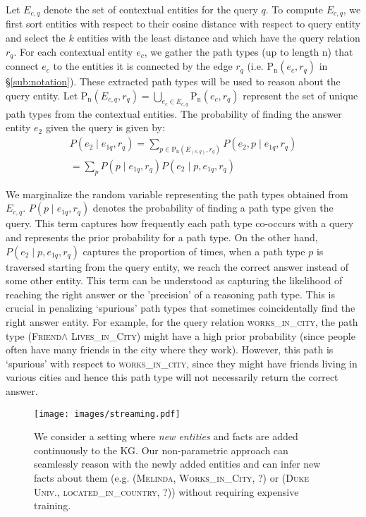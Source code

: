\documentclass[11pt,a4paper]{article}
\newcommand{\ent}{\ensuremath{e}}
\begin{document}
Let $E_{c,q}$ denote the set of contextual entities for the query $q$. To compute $E_{c,q}$, we first sort entities with respect to their cosine distance with respect to query entity and select the $k$ entities with the least distance and which have the query relation $r_q$. For each contextual entity $e_c$, we gather the path types (up to length n) that connect $e_c$ to the entities it is connected by the edge $r_q$ (i.e. $\mathrm{P_n}(e_c, r_q)$ in \S\ref{sub:notation}). These extracted path types will be used to reason about the query entity. Let $\mathrm{P_n}(E_{c,q}, r_q) = \bigcup_{e_c \in E_{c,q}} \mathrm{P_n}(e_c, r_q)$ represent the set of unique path types from the contextual entities. The probability of finding the answer entity $\ent_{2}$ given the query is given by:
\begin{align}
    P\left(\ent_{2} \mid e_{1q}, r_q\right) =  \sum_{p \in \mathrm{P_n}(E_{(c,q)}, r_q)} P(\ent_{2}, p \mid  e_{1q}, r_q) \nonumber \\ 
 =  \sum_{p} P(p \mid e_{1q}, r_q) P(\ent_{2} \mid p, e_{1q}, r_q)
 \label{eq:factorization}
\end{align}

We marginalize the random variable representing the path types obtained from $E_{c,q}$. $P(p \mid e_{1q}, r_q)$ denotes the probability of finding a path type given the query. This term captures how frequently each path type co-occurs with a query and represents the prior probability for a path type. On the other hand,  $P(\ent_{2} \mid p, e_{1q}, r_q)$  captures the proportion of times, when a path type $p$ is traversed starting from the query entity, we reach the correct answer instead of some other entity. This term can be understood as capturing the likelihood of reaching the right answer or the 'precision' of a reasoning path type. This is crucial in penalizing `spurious' path types that sometimes coincidentally find the right answer entity. For example, for the query relation \textsc{works\_in\_city}, the path type (\textsc{Friend}$\wedge$ \textsc{Lives\_in\_City}) might have a high prior probability (since people often have many friends in the city where they work). However, this path is `spurious' with respect to \textsc{works\_in\_city}, since they might have friends living in various cities and hence this path type will not necessarily return the correct answer.

\begin{figure*}
    \centering
    \texttt{[image: images/streaming.pdf]}
    \caption{We consider a setting where \emph{new entities} and facts are added continuously to the KG. Our non-parametric approach can seamlessly reason with the newly added entities and can infer new facts about them (e.g. (\textsc{Melinda}, \textsc{Works\_in\_City}, ?) or (\textsc{Duke Univ.}, \textsc{located\_in\_country}, ?)) without requiring expensive training.}
    \label{fig:open_world}
\end{figure*}
\end{document}
